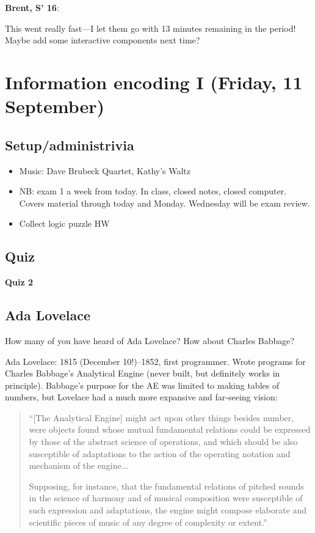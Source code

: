 \documentclass{article}
\newenvironment{reflect}[1]
{
  \begin{lrbox}{\reflectbox}
    \begin{minipage}[t]{\textwidth}
      \textbf{#1}:
}{
    \end{minipage}
  \end{lrbox}
  \fbox{\usebox{\reflectbox}}
}
\begin{document}
\begin{reflect}{Brent, S' 16}
  This went really fast---I let them go with 13 minutes remaining in
  the period!  Maybe add some interactive components next time?
\end{reflect}


\newpage

\section{Information encoding I (Friday, 11 September)}

\subsection*{Setup/administrivia}

\begin{itemize}
\item Music: Dave Brubeck Quartet, Kathy's Waltz
\item NB: exam 1 a week from today.  In class, closed notes, closed
  computer.  Covers material through today and Monday.  Wednesday will
  be exam review.
\item Collect logic puzzle HW
\end{itemize}

\subsection*{Quiz}
\textbf{Quiz 2}


\subsection*{Ada Lovelace}

How many of you have heard of Ada Lovelace?  How about Charles
Babbage?

Ada Lovelace: 1815 (December 10!)--1852, first programmer.  Wrote
programs for Charles Babbage's Analytical Engine (never built, but
definitely works in principle).  Babbage's purpose for the AE was
limited to making tables of numbers, but Lovelace had a much more
expansive and far-seeing vision:

\begin{quote}
``[The Analytical Engine] might act upon other things besides number,
were objects found whose mutual fundamental relations could be
expressed by those of the abstract science of operations, and which
should be also susceptible of adaptations to the action of the
operating notation and mechanism of the engine...

Supposing, for instance, that the fundamental relations of pitched
sounds in the science of harmony and of musical composition were
susceptible of such expression and adaptations, the engine might
compose elaborate and scientific pieces of music of any degree of
complexity or extent.''
\end{quote}
\end{document}
